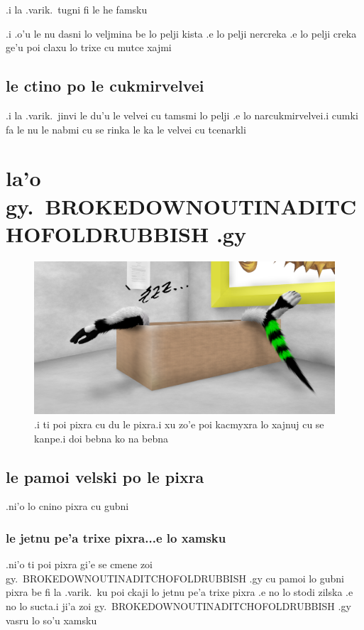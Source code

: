\documentclass{report}
\begin{document}
.i la .varik.\ tugni fi le he famsku

.i .o'u le nu dasni lo veljmina be lo pelji kista .e lo pelji nercreka .e lo pelji creka ge'u poi claxu lo trixe cu mutce xajmi

\section{le ctino po le cukmirvelvei}
.i la .varik.\ jinvi le du'u le velvei cu tamsmi lo pelji .e lo narcukmirvelvei\@  .i cumki fa le nu le nabmi cu se rinka le ka le velvei cu tcenarkli

\chapter{la'o gy.\ BROKEDOWNOUTINADITCHOFOLDRUBBISH .gy}
\begin{figure}[ht]
	\centering
	\includegraphics[width=\textwidth]{brokedownoutinaditchofoldrubbish/brokedownoutinaditchofoldrubbish.png}
	\caption[center]{.i ti poi pixra cu du le pixra\@  .i xu zo'e poi kacmyxra lo xajnuj cu se kanpe\@  .i doi bebna ko na bebna}
\end{figure}
\section{le pamoi velski po le pixra}
.ni'o lo cnino pixra cu gubni

\subsection{le jetnu pe'a trixe pixra...e lo xamsku}
.ni'o ti poi pixra gi'e se cmene zoi gy.\ BROKEDOWNOUTINADITCHOFOLDRUBBISH .gy cu pamoi lo gubni pixra be fi la .varik.\ ku poi ckaji lo jetnu pe'a trixe pixra .e no lo stodi zilska .e no lo sucta\@  .i ji'a zoi gy.\ BROKEDOWNOUTINADITCHOFOLDRUBBISH .gy vasru lo so'u xamsku
\end{document}
